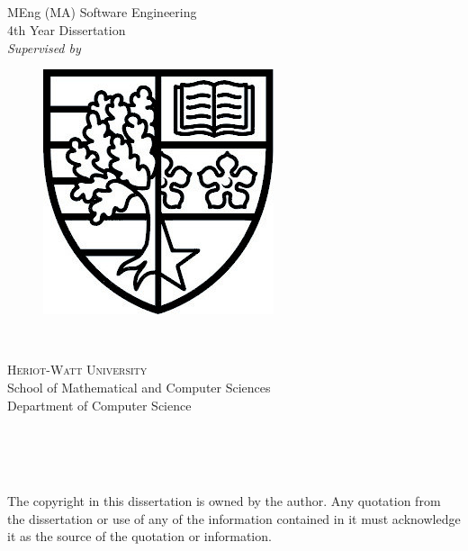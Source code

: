 \begin{titlepage}

\begin{center}
	~\\[1cm]
	{\huge \titleColor \textbf{\docTitle}}\\
	~\\[1.5cm]
	
	{\huge \docAuthor}\\[1cm]
	{\Large MEng (MA) Software Engineering}\\[0.3cm]
	{\Large 4th Year Dissertation}\\[1cm]
	{\large \textit{Supervised by} {\Large \docSupervisor}}
	~\\[2cm]
	
	\begin{figure}[h]
		\begin{center}
		\includegraphics[]{1_front_matter/hwcoa_bw.jpg}
		\end{center}
	\end{figure}	
	~\\[0cm]
	\begin{large}
		\textsc{Heriot-Watt University}\\
		School of Mathematical and Computer Sciences\\
		Department of Computer Science
	\end{large}
	~\\[1cm]
	
	{\Large \docDate}\\
	~\\[1.5cm]
	
	\begin{minipage}{0.7\textwidth}
	\singlespacing
	\begin{footnotesize}
	The copyright in this dissertation is owned by the author. Any quotation from the dissertation or use of any of the information contained in it must acknowledge it as the source of the quotation or information.
	\end{footnotesize}
	\end{minipage}
	
\end{center}

\end{titlepage}